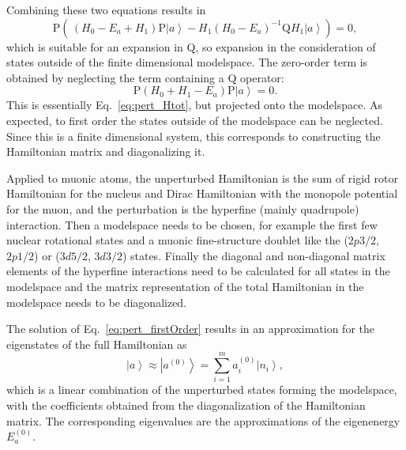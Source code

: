 Combining these two equations results in
\begin{equation}
\text{P}\left( \,
(H_0-E_a+H_1)\text{P}\left|a\right>
- H_1(H_0-E_a)^{-1}\text{Q}H_1\left|a\right>
\right) = 0,
\label{eq:pert_projectionEq}
\end{equation}
which is suitable for an expansion in $\text{Q}$, so expansion in the consideration of states outside of the finite dimensional modelspace. The zero-order term is obtained by neglecting the term containing a $\text{Q}$ operator:
\begin{equation}
\label{eq:pert_firstOrder}
\text{P}\left(H_0+H_1-E_a\right) \text{P}\left|a\right> = 0.
\end{equation}
This is essentially Eq.~\eqref{eq:pert_Htot}, but projected onto the modelspace. As expected, to first order the states outside of the modelspace can be neglected. Since this is a finite dimensional system, this corresponds to constructing the Hamiltonian matrix and diagonalizing it. 

Applied to muonic atoms, the unperturbed Hamiltonian is the sum of rigid rotor Hamiltonian for the nucleus and Dirac Hamiltonian with the monopole potential for the muon, and the perturbation is the hyperfine (mainly quadrupole) interaction. Then a modelspace needs to be chosen, for example the first few nuclear rotational states and a muonic fine-structure doublet like the ($2p3/2$, $2p1/2$) or ($3d5/2$, $3d3/2$) states. Finally the diagonal and non-diagonal matrix elements of the hyperfine interactions need to be calculated for all states in the modelspace and the matrix representation of the total Hamiltonian in the modelspace needs to be diagonalized.

The solution of Eq.~\eqref{eq:pert_firstOrder} results in an approximation for the eigenstates of the full Hamiltonian as
\begin{equation}
\label{eq:pert_firstOrderState}
\left|a\right>\approx \left|a^{(0)}\right> = \sum_{i=1}^m a_i^{(0)}\left|n_i\right>,
\end{equation}
which is a linear combination of the unperturbed states forming the modelspace, with the coefficients obtained from the diagonalization of the Hamiltonian matrix. The corresponding eigenvalues are the approximations of the eigenenergy $E_a^{(0)}$.

